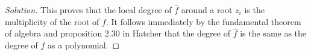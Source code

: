 \begin{proof}[Solution]
This proves that the local degree of $\hat{f}$ around a root $z_i$ is the multiplicity of the root of $f$. It follows immediately by the fundamental theorem of algebra and proposition 2.30 in Hatcher that the degree of $\hat{f}$ is the same as the degree of $f$ as a polynomial.



\begin{comment}
We can write $f(z) = g(z)(z-z_i)^{m_i}$ for some polynomial $g(z)$, and in a small neighborhood around $z_i$ we can make $g(z)$ nonzero and bound the absolute value of $f$ by $\lvert f \rvert = \lvert g(z)(z-z_i)^{m_i} \rvert < A \lvert (z-z_i)^{m_i}\rvert $ for some real number $A$. Then the homotopy defined by $H(x, t) = [(1-t)f + t(z-z_i)^{m_i}]A/K$ for some large enough $K$ makes $f$ homotopic to $A/K(z-z_i)^{m_i}$ in this neighborhood, and so the local degree of $f$ when extended to a map $S^2 \to S^2$ will be equal to that of $A/K(z-z_i)^{m_i}$. This map has degree $m_i$; The loop $\gamma(\theta): [0, 1] \to $U_i\setminus z_i: \theta \mapsto z_0 + \epsilon e^{2\pi i \theta}$ for a suitably small $\epsilon$ generates the fundamental group of $U_i \setminus z_i$, which is clearly that of a circle. Our polynomial takes $\gamma$ to $\gamma'(\theta) : [0, 1] \to V\setminus\{0\} e^{2\pi m_i i \theta}$ which is $m_i$ times a generator of the fundamental group of $V\setminus\{0\}$.
\end{comment}

\end{proof}




